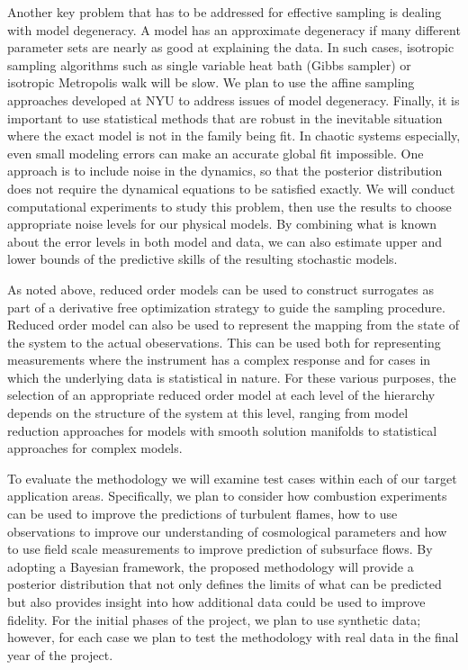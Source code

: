 \documentclass[11pt]{article}
\begin{document}
Another key problem that has to be addressed for effective sampling is dealing with model degeneracy.
A model has an approximate degeneracy if many different parameter sets are nearly as good at explaining the data.
In such cases, isotropic sampling algorithms such as single variable heat bath (Gibbs sampler) or isotropic
Metropolis walk will be slow. We plan to use the affine sampling approaches developed at NYU to address issues of model degeneracy.
Finally, it is important to use statistical methods that are robust in the inevitable situation where the exact model is not in
the family being fit.
In chaotic systems especially, even small modeling errors can make an accurate global fit impossible.
One approach is to include noise in the dynamics, so that the posterior distribution does not require the
dynamical equations to be satisfied exactly.
We will conduct computational experiments to study this problem, then use the results to 
choose appropriate noise levels for our physical models.
By combining what is known about the error levels in both model and data, we can also estimate upper and lower bounds
of the predictive skills of the resulting stochastic models.

As noted above, reduced order models can be used to construct surrogates as
part of a derivative free optimization strategy
to guide the sampling procedure.
Reduced order model can also be used to represent the mapping from the state of the system
to the actual obeservations.  This can be used both for representing measurements where the
instrument has a complex response and for cases in which the underlying data is statistical in
nature.
For these various purposes, the selection of an appropriate reduced order model at each level
of the hierarchy depends on the
structure of the system at this level, ranging from model reduction approaches for models
with smooth solution manifolds
to statistical approaches for complex models.

To evaluate the methodology we will examine test cases within each of our target application areas.
Specifically, we plan to consider how combustion experiments can be used to improve
the predictions of turbulent flames, how to use observations to improve our understanding of
cosmological parameters and how to use field scale measurements to improve prediction of subsurface
flows.
By adopting a Bayesian framework, the proposed methodology will provide a posterior distribution that
not only defines the limits of what can be predicted but also provides insight into how
additional data could be used to improve fidelity.
For the initial phases of the project, we plan to use synthetic data; however, for each case we
plan to test the methodology with real data in the final year of the project.
\end{document}
